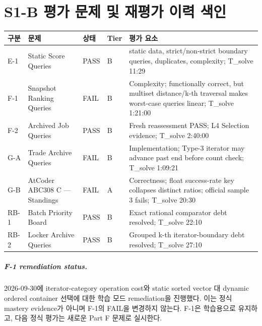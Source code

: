 \chapter{S1-B 평가 문제 및 재평가 이력 색인}

\begin{longtable}{p{1.6cm}p{5.3cm}p{1.9cm}p{1.8cm}p{4.5cm}}
\toprule
\textbf{구분} & \textbf{문제} & \textbf{상태} & \textbf{Tier} & \textbf{평가 요소} \\
\midrule
E-1 & Static Score Queries & PASS & B & static data, strict/non-strict boundary queries, duplicates, complexity; T\_solve 11:29 \\
F-1 & Snapshot Ranking Queries & FAIL & B & Complexity; functionally correct, but multiset distance/k-th traversal makes worst-case queries linear; T\_solve 1:21:00 \\
F-2 & Archived Job Queries & PASS & B & Fresh reassessment PASS; L4 Selection evidence; T\_solve 2:40:00 \\
G-A & Trade Archive Queries & FAIL & B & Implementation; Type-3 iterator may advance past end before count check; T\_solve 1:09:21 \\
G-B & AtCoder ABC308 C --- Standings & FAIL & A & Correctness; float success-rate key collapses distinct ratios; official sample 3 fails; T\_solve 20:30 \\
RB-1 & Batch Priority Board & PASS & B & Exact rational comparator debt resolved; T\_solve 22:10 \\
RB-2 & Locker Archive Queries & PASS & B & Grouped k-th iterator-boundary debt resolved; T\_solve 27:10 \\
\bottomrule
\end{longtable}


\paragraph{F-1 remediation status.}
2026-09-30에 iterator-category operation cost와 static sorted vector 대 dynamic ordered container 선택에 대한 학습 모드 remediation을 진행했다. 이는 정식 mastery evidence가 아니며 F-1의 FAIL을 변경하지 않는다. F-1은 학습용으로 유지하고, 다음 정식 평가는 새로운 Part F 문제로 실시한다.
